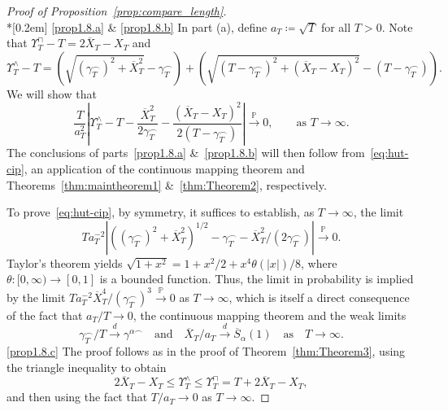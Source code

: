 \documentclass[10pt]{amsart}
\theoremstyle{definition}\newtheorem{defi}[theo]{Definition}\newtheorem{rema}[theo]{Remark}\newtheorem{exam}[theo]{Example}\newtheorem{exem}[theo]{Example}\newtheorem{nota}[theo]{Notation}
\newcommand\p{\mathds{P}}
\newcommand\1{\mathds{1}}
\newcommand\cid{\xrightarrow{d}}
\newcommand\cip{\xrightarrow{\p}}
\newcommand\ov[1]{\overline{#1}}
\begin{document}
\begin{proof}[Proof of Proposition~\ref{prop:compare_length}]\ \\*[0.2em]
\eqref{prop1.8.a} \& \eqref{prop1.8.b} In part (a), define $a_T\coloneqq\sqrt{T}$ for all $T>0$. Note that $\Upsilon^\sqcap_T-T=2\ov{X}_T-X_T$ and
\[
\Upsilon^\wedge_T-T =\left(\sqrt{\left(\gamma^\frown_T\right)^2 + \ov{X}_T^2}-\gamma^\frown_T\right) +\left(\sqrt{\left(T-\gamma^\frown_T\right)^2 + \left(\ov{X}_T-X_T\right)^2} -\left(T-\gamma^\frown_T\right)\right).
\]
We will show that
\begin{equation}\label{eq:hut-cip}
\frac{T}{a_T^2}\left|\Upsilon_T^\wedge-T- \frac{\ov X_T^2}{2\gamma_T^\frown}-\frac{\left(\ov X_T-X_T\right)^2}{2\left(T-\gamma_T^\frown\right)}\right|
\cip 0,\qquad \text{as }T\to\infty.
\end{equation}
The conclusions of parts~\eqref{prop1.8.a} \&~\eqref{prop1.8.b} will then follow from~\eqref{eq:hut-cip}, an application of the continuous mapping theorem and Theorems~\ref{thm:maintheorem1} \&~\ref{thm:Theorem2}, respectively.

To prove~\eqref{eq:hut-cip}, by symmetry, it suffices to establish, as $T\to\infty$, the limit
\[
Ta_T^{-2}\left|\left(\left(\gamma^\frown_T\right)^2 + \ov{X}_T^2\right)^{1/2}-\gamma^\frown_T - \ov{X}_T^2/\left(2\gamma^\frown_T\right)\right|\cip 0.
\]
Taylor's theorem yields $\sqrt{1+x^2}=1+x^2/2+x^4\theta(|x|)/8$, where $\theta:[0,\infty)\to[0,1]$ is a bounded function. Thus, the limit in probability is implied by the limit $Ta_T^{-2}\ov{X}_T^4/(\gamma^\frown_T)^3\cip 0$ as $T\to\infty$, which is itself a direct consequence of the fact that $a_T/T\to 0$, the continuous mapping theorem and the weak limits 
\[
\gamma^\frown_T/T\cid \gamma^{\alpha\frown}\quad\text{and}\quad \ov{X}_T/a_T\cid \ov{S}_\alpha(1)\quad\text{as}\quad T \to \infty.
\]
\eqref{prop1.8.c} The proof follows as in the proof of Theorem~\ref{thm:Theorem3}, using the triangle inequality to obtain
\[
2\ov{X}_T-X_T
\le\Upsilon^\wedge_T
\le\Upsilon^\sqcap_T =T+2\ov{X}_T-X_T,
\]
and then using the fact that $T/a_T\to 0$ as $T \to \infty$.
\end{proof}
\end{document}
